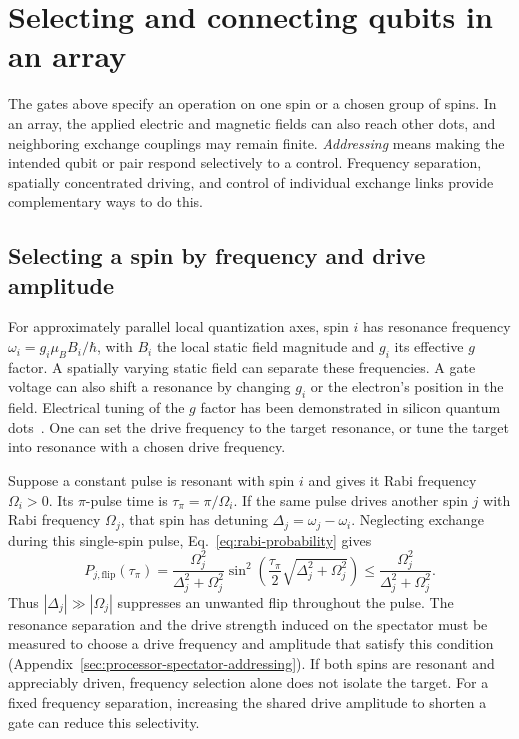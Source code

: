 \section{Selecting and connecting qubits in an array}
\label{sec:platform-array-selection}

The gates above specify an operation on one spin or a chosen group
of spins. In an array, the applied electric and magnetic fields can
also reach other dots, and neighboring exchange couplings may
remain finite. \emph{Addressing} means making the intended qubit
or pair respond selectively to a control. Frequency separation,
spatially concentrated driving, and control of individual exchange
links provide complementary ways to do this.

\subsection{Selecting a spin by frequency and drive amplitude}

For approximately parallel local quantization axes, spin $i$ has
resonance frequency $\omega_i=g_i\mu_B B_i/\hbar$, with $B_i$ the
local static field magnitude and $g_i$ its effective $g$ factor.
A spatially varying static field can separate these frequencies.
A gate voltage can also shift a resonance by changing $g_i$ or the
electron's position in the field. Electrical tuning of the $g$
factor has been demonstrated in silicon quantum dots~\cite{Veldhorst2014Addressable}.
One can set the drive frequency to the target resonance, or tune
the target into resonance with a chosen drive frequency.

Suppose a constant pulse is resonant with spin $i$ and gives it
Rabi frequency $\Omega_i>0$. Its $\pi$-pulse time is
$\tau_\pi=\pi/\Omega_i$. If the same pulse drives another spin $j$
with Rabi frequency $\Omega_j$, that spin has detuning
$\Delta_j=\omega_j-\omega_i$. Neglecting exchange during this
single-spin pulse, Eq.~\eqref{eq:rabi-probability} gives
\begin{equation}
 P_{j,\mathrm{flip}}(\tau_\pi)
 =\frac{\Omega_j^2}{\Delta_j^2+\Omega_j^2}
   \sin^2\!\left(\frac{\tau_\pi}{2}
                   \sqrt{\Delta_j^2+\Omega_j^2}\right)
 \leq\frac{\Omega_j^2}{\Delta_j^2+\Omega_j^2}.
 \label{eq:platform-frequency-selection}
\end{equation}
Thus $|\Delta_j|\gg|\Omega_j|$ suppresses an unwanted flip
throughout the pulse. The resonance separation and the drive
strength induced on the spectator must be measured to choose a
drive frequency and amplitude that satisfy this condition
(Appendix~\ref{sec:processor-spectator-addressing}).
If both spins are resonant and appreciably
driven, frequency selection alone does not isolate the target.
For a fixed frequency separation, increasing the shared drive
amplitude to shorten a gate can reduce this selectivity.

